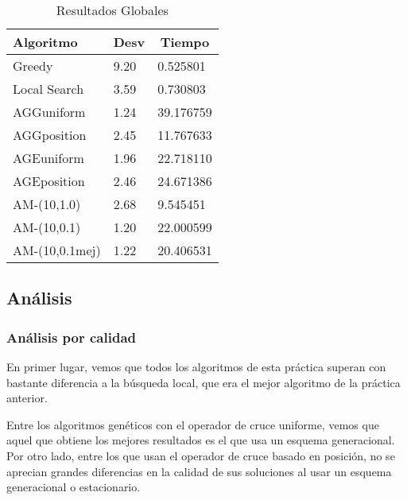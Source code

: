 \documentclass[10pt,a4paper]{article}
\begin{document}
\begin{table}[h]
	\centering
	\begin{tabular}{|l|l|l|}
		\hline
		\textbf{Algoritmo} & \multicolumn{1}{c|}{\textbf{Desv}} & \multicolumn{1}{c|}{\textbf{Tiempo}} \\ \hline
		Greedy             & 9.20                               & 0.525801                             \\ \hline
		Local Search       & 3.59                               & 0.730803                             \\ \hline
		AGGuniform         & 1.24                               & 39.176759                            \\ \hline
		AGGposition        & 2.45                               & 11.767633                            \\ \hline
		AGEuniform         & 1.96                               & 22.718110                            \\ \hline
		AGEposition        & 2.46                               & 24.671386                            \\ \hline
		AM-(10,1.0)        & 2.68                               & 9.545451                             \\ \hline
		AM-(10,0.1)        & 1.20                               & 22.000599                            \\ \hline
		AM-(10,0.1mej)     & 1.22                               & 20.406531                            \\ \hline
	\end{tabular}
	\caption{Resultados Globales}
	\label{table:resultados_globales}
\end{table}




\subsection{Análisis}

\subsubsection{Análisis por calidad}

En primer lugar, vemos que todos los algoritmos de esta práctica superan con bastante diferencia a la búsqueda local, que era el mejor algoritmo de la práctica anterior. 

Entre los algoritmos genéticos con el operador de cruce uniforme, vemos que aquel que obtiene los mejores resultados es el que usa un esquema generacional. Por otro lado, entre los que usan el operador de cruce basado en posición, no se aprecian grandes diferencias en la calidad de sus soluciones al usar un esquema generacional o estacionario. 
\end{document}
